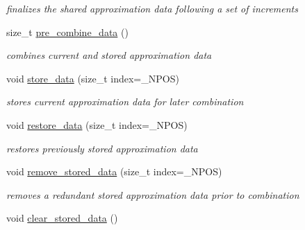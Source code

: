 \begin{DoxyCompactItemize}
\begin{DoxyCompactList}\small\item\em finalizes the shared approximation data following a set of increments \end{DoxyCompactList}\item 
size\+\_\+t \hyperlink{classPecos_1_1SharedInterpPolyApproxData_a9eb4d06b29a49d454be12741309d8a2b}{pre\+\_\+combine\+\_\+data} ()\label{classPecos_1_1SharedInterpPolyApproxData_a9eb4d06b29a49d454be12741309d8a2b}

\begin{DoxyCompactList}\small\item\em combines current and stored approximation data \end{DoxyCompactList}\item 
void \hyperlink{classPecos_1_1SharedInterpPolyApproxData_a3cc1fd74564bd6f83a59ac8ddc1fc264}{store\+\_\+data} (size\+\_\+t index=\+\_\+\+N\+P\+OS)\label{classPecos_1_1SharedInterpPolyApproxData_a3cc1fd74564bd6f83a59ac8ddc1fc264}

\begin{DoxyCompactList}\small\item\em stores current approximation data for later combination \end{DoxyCompactList}\item 
void \hyperlink{classPecos_1_1SharedInterpPolyApproxData_a6e88613d26c8cf89c7d8365016ee67c2}{restore\+\_\+data} (size\+\_\+t index=\+\_\+\+N\+P\+OS)\label{classPecos_1_1SharedInterpPolyApproxData_a6e88613d26c8cf89c7d8365016ee67c2}

\begin{DoxyCompactList}\small\item\em restores previously stored approximation data \end{DoxyCompactList}\item 
void \hyperlink{classPecos_1_1SharedInterpPolyApproxData_ab48a802281615eb09255d0a8acd06987}{remove\+\_\+stored\+\_\+data} (size\+\_\+t index=\+\_\+\+N\+P\+OS)\label{classPecos_1_1SharedInterpPolyApproxData_ab48a802281615eb09255d0a8acd06987}

\begin{DoxyCompactList}\small\item\em removes a redundant stored approximation data prior to combination \end{DoxyCompactList}\item 
void \hyperlink{classPecos_1_1SharedInterpPolyApproxData_a263397cd08813d707b4084cf13cad679}{clear\+\_\+stored\+\_\+data} ()\label{classPecos_1_1SharedInterpPolyApproxData_a263397cd08813d707b4084cf13cad679}


\end{DoxyCompactItemize}
